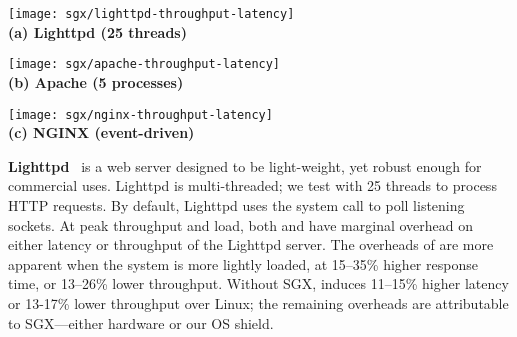 \begin{figure*}[t!]
\centering

\begin{minipage}{.45\textwidth}
\centering
\footnotesize
\vspace{6pt}
\texttt{[image: sgx/lighttpd-throughput-latency]}\\
\vspace{3pt}
{\bf (a) Lighttpd (25 threads)}
\vspace{6pt}
\end{minipage}
\begin{minipage}{.45\textwidth}
\centering
\footnotesize
\vspace{6pt}
\texttt{[image: sgx/apache-throughput-latency]}\\
\vspace{3pt}
{\bf (b) Apache (5 processes)}
\vspace{6pt}
\end{minipage}
\begin{minipage}{.45\textwidth}
\centering
\footnotesize
\vspace{6pt}
\texttt{[image: sgx/nginx-throughput-latency]}\\
\vspace{3pt}
{\bf (c) NGINX (event-driven)}
\vspace{6pt}
\end{minipage}

\caption{Throughput versus latency of web server workloads, including Lighttpd, Apache, and NGINX, on native Linux, \graphene{}, and \graphenesgx{}.
We use an ApacheBench client to gradually increase load, and plot
throughput versus latency at each point.  Lower and further right
is better.
}
\label{fig:server-throughput-latency}
\end{figure*}


{\bf Lighttpd}~\cite{lighttpd} is a web server designed to be light-weight, yet robust enough for commercial uses. 
Lighttpd is multi-threaded; we test with 25 threads to process HTTP requests. 
By default, Lighttpd uses the  system call to poll listening sockets.
At peak throughput and load,  both \graphene{} and \graphenesgx{} have marginal overhead on either latency or throughput of the Lighttpd server.
The overheads of \graphene{} are more apparent when the system
is more lightly loaded, at 
15--35\% higher response time, or 13--26\% lower throughput. 
Without SGX, \graphene{} induces 
11--15\% higher latency or 13-17\% lower throughput over Linux;
the remaining overheads are attributable to SGX---either hardware or our OS shield.

